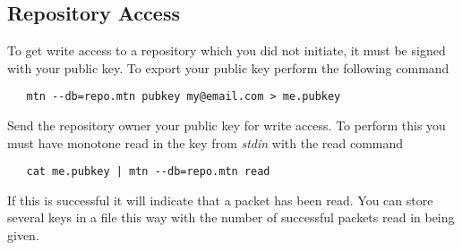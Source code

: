 \documentclass[12pt]{article}
\begin{document}
\subsection*{Repository Access}

To get write access to a repository which you did not initiate, it must be signed with your public key. To export your public key perform the following command
\begin{verbatim}
   mtn --db=repo.mtn pubkey my@email.com > me.pubkey 
\end{verbatim}
Send the repository owner your public key for write access. To perform this you must have monotone read in the key from {\it stdin} with the read command
\begin{verbatim}
   cat me.pubkey | mtn --db=repo.mtn read 
\end{verbatim}
If this is successful it will indicate that a packet has been read. You can store several keys in a file this way with the number of successful packets read in being given. 


\end{document}
